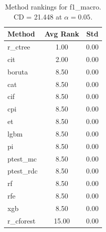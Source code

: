 \begin{table}[h]
\centering
\caption{Method rankings for f1_macro. CD = 21.448 at $\alpha=0.05$.}
\label{tab:ranks_f1_macro}
\begin{tabular}{lcc}
\toprule
Method & Avg Rank & Std \\
\midrule
r_ctree & 1.00 & 0.00 \\
cit & 2.00 & 0.00 \\
boruta & 8.50 & 0.00 \\
cat & 8.50 & 0.00 \\
cif & 8.50 & 0.00 \\
cpi & 8.50 & 0.00 \\
et & 8.50 & 0.00 \\
lgbm & 8.50 & 0.00 \\
pi & 8.50 & 0.00 \\
ptest_mc & 8.50 & 0.00 \\
ptest_rdc & 8.50 & 0.00 \\
rf & 8.50 & 0.00 \\
rfe & 8.50 & 0.00 \\
xgb & 8.50 & 0.00 \\
r_cforest & 15.00 & 0.00 \\
\bottomrule
\end{tabular}
\end{table}